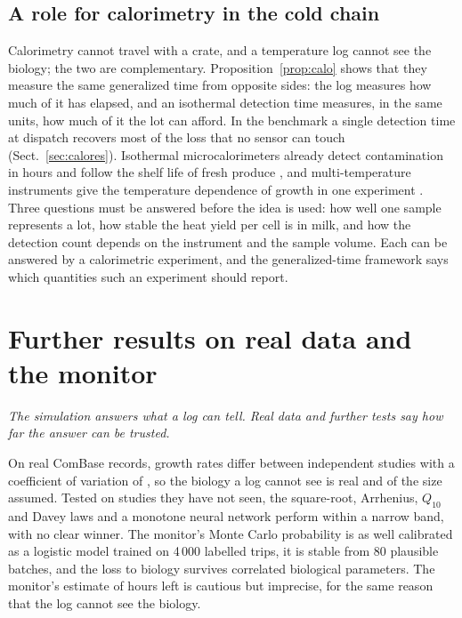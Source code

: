 \documentclass[11pt,a4paper,twoside,openany]{book}
\newcommand{\hook}[1]{{\noindent\fontsize{14}{20}\selectfont\itshape\color{dggrey}#1\par}\vspace{14pt}}
\newcommand{\secref}[1]{Sect.~\ref{#1}}
\theoremstyle{plain}\newtheorem{proposition}{Proposition}\newtheorem{corollary}{Corollary}
\theoremstyle{definition}\newtheorem{definition}{Definition}[chapter]
\begin{document}
\TabCalo

\section{A role for calorimetry in the cold chain}
Calorimetry cannot travel with a crate, and a temperature log cannot see the biology; the two are complementary. Proposition~\ref{prop:calo} shows that they measure the same generalized time from opposite sides: the log measures how much of it has elapsed, and an isothermal detection time measures, in the same units, how much of it the lot can afford. In the benchmark a single detection time at dispatch recovers most of the loss that no sensor can touch (\secref{sec:calores}). Isothermal microcalorimeters already detect contamination in hours \cite{fricke2020} and follow the shelf life of fresh produce \cite{haman2019}, and multi-temperature instruments give the temperature dependence of growth in one experiment \cite{wadso2011}. Three questions must be answered before the idea is used: how well one sample represents a lot, how stable the heat yield per cell is in milk, and how the detection count depends on the instrument and the sample volume. Each can be answered by a calorimetric experiment, and the generalized-time framework says which quantities such an experiment should report.


\chapter{Further results on real data and the monitor}\label{ch:further}
\hook{The simulation answers what a log can tell. Real data and further tests say how far the answer can be trusted.}
\begin{summary}
On real ComBase records, growth rates differ between independent studies with a coefficient of variation of \GlCvB, so the biology a log cannot see is real and of the size assumed. Tested on studies they have not seen, the square-root, Arrhenius, $Q_{10}$ and Davey laws and a monotone neural network perform within a narrow band, with no clear winner. The monitor's Monte Carlo probability is as well calibrated as a logistic model trained on 4\,000 labelled trips, it is stable from 80 plausible batches, and the loss to biology survives correlated biological parameters. The monitor's estimate of hours left is cautious but imprecise, for the same reason that the log cannot see the biology.
\end{summary}
\end{document}
